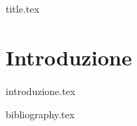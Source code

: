 \documentclass[a4paper,11pt,oneside]{book}
\begin{document}
\frontmatter

{title.tex}

\tableofcontents

\mainmatter


\chapter{Introduzione}
{introduzione.tex}

\cleardoublepage

{bibliography.tex}
\end{document}

